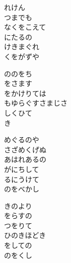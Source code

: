 \documentclass[10pt,b5j]{tarticle} %
\begin{document}
\vspace{1.5em} %
\newcommand{\linespace}{0.5em} %
\newcommand{\blocksize}{0.5\hsize} %
\begin{enumerate} %
    \begin{minipage}[c]{\blocksize}
    
        \vspace{\linespace}
        \item
        れけん\\
        つまでも\\
        なくをこえて\\
        にたるの\\
        けきまぐれ\\
        くをがずや
        
        \vspace{\linespace}
        \item
        ののをち\\
        をさます\\
        をかけりては\\
        もゆらぐすさまじさ\\
        しくひて\\
        き
        
        \vspace{\linespace}
        \item
        めぐるのや\\
        さざめくげぬ\\
        あはれあるの\\
        がにちして\\
        るにうけて\\
        のをべかし
        
        \vspace{\linespace}
        \item
        きのより\\
        をらすの\\
        つをりて\\
        ひのきほどき\\
        をしての\\
        のをくし
        

\end{minipage}
\end{enumerate}
\end{document}
